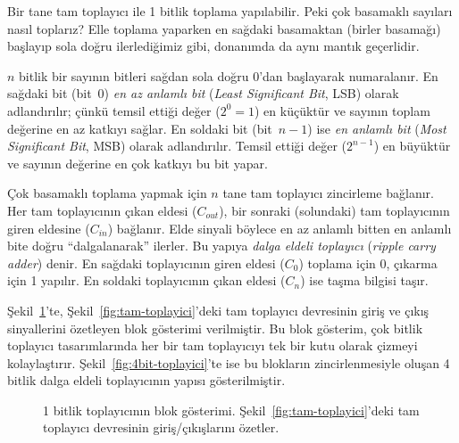 Bir tane tam toplayıcı ile 1 bitlik toplama yapılabilir. Peki çok basamaklı sayıları nasıl toplarız? Elle toplama yaparken en sağdaki basamaktan (birler basamağı) başlayıp sola doğru ilerlediğimiz gibi, donanımda da aynı mantık geçerlidir.

$n$ bitlik bir sayının bitleri sağdan sola doğru 0'dan başlayarak numaralanır. En sağdaki bit (bit~0) \emph{en az anlamlı bit} (\emph{Least Significant Bit}, LSB) olarak adlandırılır; çünkü temsil ettiği değer ($2^0 = 1$) en küçüktür ve sayının toplam değerine en az katkıyı sağlar. En soldaki bit (bit~$n{-}1$) ise \emph{en anlamlı bit} (\emph{Most Significant Bit}, MSB) olarak adlandırılır. Temsil ettiği değer ($2^{n-1}$) en büyüktür ve sayının değerine en çok katkıyı bu bit yapar.

Çok basamaklı toplama yapmak için $n$ tane tam toplayıcı zincirleme bağlanır. Her tam toplayıcının çıkan eldesi ($C_{out}$), bir sonraki (solundaki) tam toplayıcının giren eldesine ($C_{in}$) bağlanır. Elde sinyali böylece en az anlamlı bitten en anlamlı bite doğru ``dalgalanarak'' ilerler. Bu yapıya \emph{dalga eldeli toplayıcı} (\emph{ripple carry adder}) denir. En sağdaki toplayıcının giren eldesi ($C_0$) toplama için 0, çıkarma için 1 yapılır. En soldaki toplayıcının çıkan eldesi ($C_n$) ise taşma bilgisi taşır.

Şekil~\ref{fig:1bit-toplayici}'te, Şekil~\ref{fig:tam-toplayici}'deki tam toplayıcı devresinin giriş ve çıkış sinyallerini özetleyen blok gösterimi verilmiştir. Bu blok gösterim, çok bitlik toplayıcı tasarımlarında her bir tam toplayıcıyı tek bir kutu olarak çizmeyi kolaylaştırır. Şekil~\ref{fig:4bit-toplayici}'te ise bu blokların zincirlenmesiyle oluşan 4 bitlik dalga eldeli toplayıcının yapısı gösterilmiştir.

\begin{figure}[htbp]
\centering
{}
\caption[1 bitlik toplay{\i}c{\i} (blok g{\"o}sterimi)]{1 bitlik toplayıcının blok gösterimi. Şekil~\ref{fig:tam-toplayici}'deki tam toplayıcı devresinin giriş/çıkışlarını özetler.}
\label{fig:1bit-toplayici}
\end{figure}

